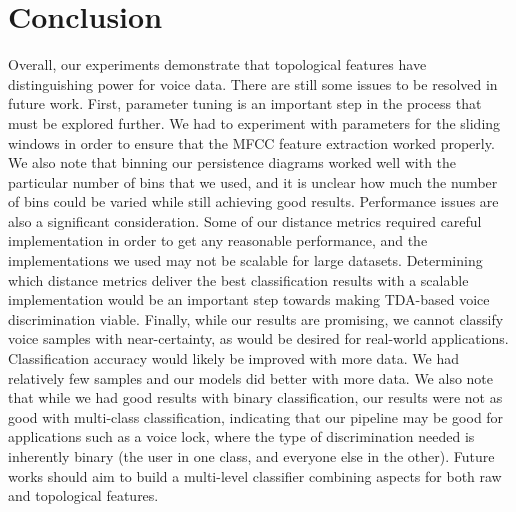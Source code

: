 \documentclass[12pt]{article}
\begin{document}
\section{Conclusion}
\-\hspace{1cm} Overall, our experiments demonstrate that topological features
have distinguishing power for voice data.
\newline \-\hspace{1cm} There are still some issues to be
resolved in future work. First, parameter tuning is an important step in the
process that must be explored further. We had to experiment with parameters for
the sliding windows in order to ensure that the MFCC feature extraction worked
properly. We also note that binning our persistence diagrams worked well with
the particular number of bins that we used, and it is unclear how much the
number of bins could be varied while still achieving good results.
\newline \-\hspace{1cm} Performance issues are also a significant consideration.
Some of our distance metrics required careful implementation in order to get
any reasonable performance, and the implementations we used may not be scalable
for large datasets. Determining which distance metrics deliver the best
classification results with a scalable implementation would be an important
step towards making TDA-based voice discrimination viable.
\newline \-\hspace{1cm} Finally, while our results are promising, we cannot
classify voice samples with near-certainty, as would be desired for real-world
applications. Classification accuracy would likely be improved with more data.
We had relatively few samples and our models did better with more data. We also
note that while we had good results with binary classification, our results were not as good with multi-class classification, indicating
that our pipeline may be good for applications such as a voice lock, where the
type of discrimination needed is inherently binary (the user in one class,
and everyone else in the other). Future works should aim to build a
multi-level classifier combining aspects for both raw and topological features. 

\newpage
\end{document}
